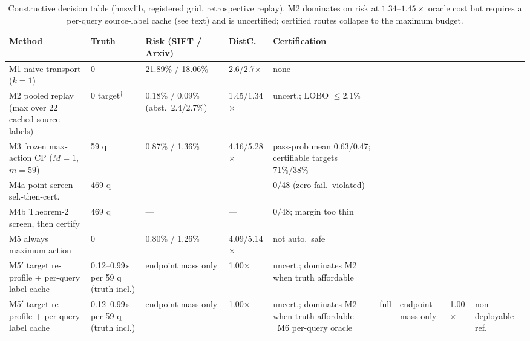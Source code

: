 \documentclass{article}
\begin{document}
\begin{table}[t]
\centering
\caption{Constructive decision table (hnswlib, registered grid, retrospective replay). M2 dominates on risk
at $1.34$--$1.45\times$ oracle cost but requires a per-query source-label cache (see text) and is
uncertified; certified routes collapse to the maximum budget.}
\label{tab:constructive}
\scriptsize
\setlength{\tabcolsep}{2.8pt}
\begin{tabular}{p{3.2cm}p{1.0cm}p{3.0cm}p{1.4cm}p{4.0cm}}
\toprule
Method & Truth & Risk (SIFT / Arxiv) & DistC. & Certification \\
\midrule
M1 naive transport ($k{=}1$) & 0 & 21.89\% / 18.06\% & 2.6/2.7$\times$ & none \\
M2 pooled replay (max over 22 cached source labels) & 0 target$^{\dagger}$ & 0.18\% / 0.09\% (abst.\ 2.4/2.7\%) & 1.45/1.34$\times$ & uncert.; LOBO $\le$2.1\% \\
M3 frozen max-action CP ($M{=}1$, $m{=}59$) & 59 q & 0.87\% / 1.36\% & 4.16/5.28$\times$ & pass-prob mean 0.63/0.47; certifiable targets 71\%/38\% \\
M4a point-screen sel.-then-cert. & 469 q & --- & --- & 0/48 (zero-fail.\ violated) \\
M4b Theorem-2 screen, then certify & 469 q & --- & --- & 0/48; margin too thin \\
M5 always maximum action & 0 & 0.80\% / 1.26\% & 4.09/5.14$\times$ & not auto.\ safe \\
M5$'$ target re-profile + per-query label cache & 0.12--0.99\,s per 59 q (truth incl.) & endpoint mass only & 1.00$\times$ & uncert.; dominates M2 when truth affordable \\
M5$'$ target re-profile + per-query label cache & 0.12--0.99\,s per 59 q (truth incl.) & endpoint mass only & 1.00$\times$ & uncert.; dominates M2 when truth affordable \
M6 per-query oracle & full & endpoint mass only & 1.00$\times$ & non-deployable ref. \\
\bottomrule
\end{tabular}
\end{table}
\end{document}
